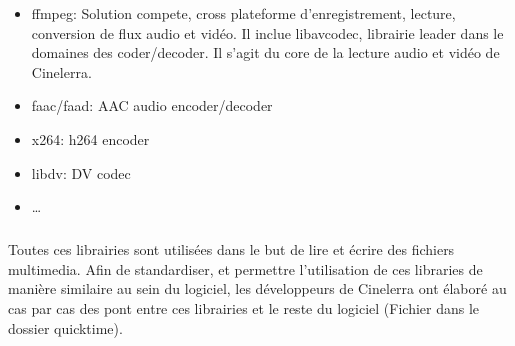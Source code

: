 \begin{itemize}

  \item{ffmpeg: Solution compete, cross plateforme
  d'enregistrement, lecture, conversion de flux audio et vidéo. Il
  inclue libavcodec, librairie leader dans le domaines des
  coder/decoder.
Il s'agit du core de la
  lecture audio et vidéo de Cinelerra.}

  \item{faac/faad: AAC audio encoder/decoder}

  \item{x264: h264 encoder}

  \item{libdv: DV codec}

  \item{\ldots}

\end{itemize}

\subparagraph{}

Toutes ces librairies sont utilisées dans le but de lire et écrire des
fichiers multimedia. Afin de standardiser, et permettre l'utilisation de
ces libraries de manière similaire au sein du logiciel, les développeurs
de Cinelerra ont élaboré au cas par cas des pont entre ces librairies
et le reste du logiciel (Fichier dans le dossier quicktime).

\subparagraph{}







